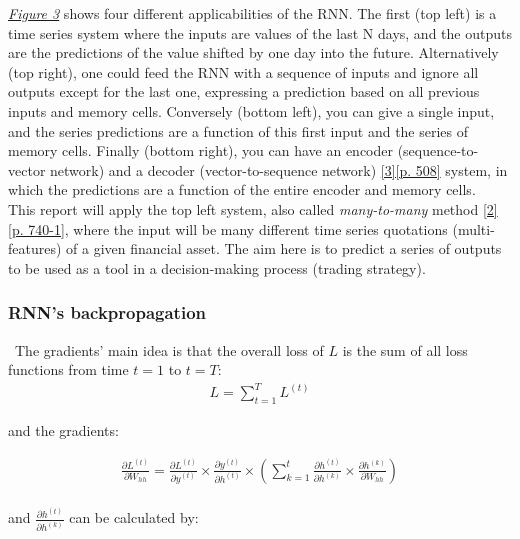 \hyperref[fig:RNN2]{\textit{Figure 3}} shows four different applicabilities of the RNN. The first (top left) is a time series system where the inputs are values of the last N days, and the outputs are the predictions of the value shifted by one day into the future. Alternatively (top right), one could feed the RNN with a sequence of inputs and ignore all outputs except for the last one, expressing a prediction based on all previous inputs and memory cells. Conversely (bottom left), you can give a single input, and the series predictions are a function of this first input and the series of memory cells. Finally (bottom right), you can have an encoder (sequence-to-vector network) and a decoder (vector-to-sequence network) \hyperref[Bib:Aurelien Geron]{[3][p. 508]} system, in which the predictions are a function of the entire encoder and memory cells.\\

This report will apply the top left system, also called \textit{many-to-many} method \hyperref[Bib:Sebastian Raschka, Vahid Mirjalili]{[2][p. 740-1]}, where the input will be many different time series quotations (multi-features) of a given financial asset. The aim here is to predict a series of outputs to be used as a tool in a decision-making process (trading strategy).

\subsubsection{RNN's backpropagation}
\label{chap:RNN's backpropagation}

\quad \, The gradients' main idea is that the overall loss of $L$ is the sum of all loss functions from time $t=1$ to $t=T$:\\

\begin{align*}
L = \sum_{t=1}^{T}L^{(t)}
\end{align*}

\noindent and the gradients:

\begin{align*}
\frac{\partial L^{(t)}}{\partial W_{hh}}=\frac{\partial L^{(t)}}{\partial y^{(t)}} \times \frac{\partial y^{(t)}}{\partial h^{(t)}} \times ( \sum_{k=1}^{t} \frac{\partial h^{(t)}}{\partial h^{(k)}} \times \frac{\partial h^{(k)}}{\partial W_{hh}})
\end{align*}\\

\noindent and $\frac{\partial h^{(t)}}{\partial h^{(k)}}$ can be calculated by:

